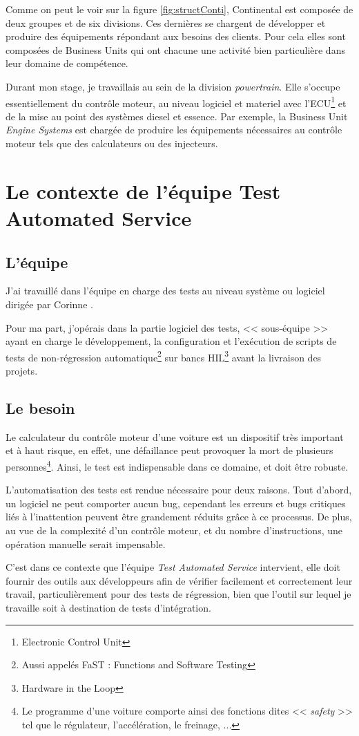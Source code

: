 		Comme on peut le voir sur la figure \ref{fig:structConti}, Continental est composée de deux groupes et de six divisions. Ces dernières se chargent de développer et produire des équipements répondant aux besoins des clients. Pour cela elles sont composées de Business Units qui ont chacune une activité bien particulière dans leur domaine de compétence. 

Durant mon stage, je travaillais au sein de la division \textit{powertrain}. Elle s'occupe essentiellement du contrôle moteur, au niveau logiciel et materiel avec l'ECU\footnote{Electronic Control Unit} et de la mise au point des systèmes diesel et essence. Par exemple, la Business Unit \textit{Engine Systems} est chargée de produire les équipements nécessaires au contrôle moteur tels que des calculateurs ou des injecteurs.

	\section{Le contexte de l'équipe Test Automated Service}
 		\subsection{L'équipe}
 		J'ai travaillé dans l'équipe en charge des tests au niveau système ou logiciel dirigée par Corinne . 
 		
 		Pour ma part, j'opérais dans la partie logiciel des tests, << sous-équipe >> ayant en charge le développement, la configuration et l'exécution de scripts de tests de non-régression automatique\footnote{Aussi appelés FaST : Functions and Software Testing} sur bancs HIL\footnote{Hardware in the Loop} avant la livraison des projets.
		
 		\subsection{Le besoin} \label{besoinTests}
 		Le calculateur du contrôle moteur d'une voiture est un dispositif très important et à haut risque, en effet, une défaillance peut provoquer la mort de plusieurs personnes\footnote{Le programme d'une voiture comporte ainsi des fonctions dites << \textit{safety} >> tel que le régulateur, l'accélération, le freinage, ...}. Ainsi, le test est indispensable dans ce domaine, et doit être robuste. 

L'automatisation des tests est rendue nécessaire pour deux raisons. Tout d'abord, un logiciel ne peut comporter aucun bug, cependant les erreurs et bugs critiques liés à l'inattention peuvent être grandement réduits grâce à ce processus. De plus, au vue de la complexité d'un contrôle moteur, et du nombre d'instructions, une opération manuelle serait impensable. 

C'est dans ce contexte que l'équipe \textit{Test Automated Service} intervient, elle doit fournir des outils aux développeurs afin de vérifier facilement et correctement leur travail, particulièrement pour des tests de régression, bien que l'outil sur lequel je travaille soit à destination de tests d'intégration.
